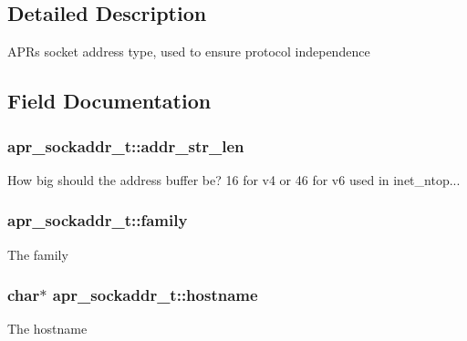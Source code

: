 \subsection{Detailed Description}
A\+P\+Rs socket address type, used to ensure protocol independence 

\subsection{Field Documentation}
\subsubsection[{\texorpdfstring{addr\+\_\+str\+\_\+len}{addr_str_len}}]{ apr\+\_\+sockaddr\+\_\+t\+::addr\+\_\+str\+\_\+len}\hypertarget{structapr__sockaddr__t_a8f7cda5562e904a1398ed5a4a6f0a9d9}{}\label{structapr__sockaddr__t_a8f7cda5562e904a1398ed5a4a6f0a9d9}
How big should the address buffer be? 16 for v4 or 46 for v6 used in inet\+\_\+ntop... 
\subsubsection[{\texorpdfstring{family}{family}}]{ apr\+\_\+sockaddr\+\_\+t\+::family}\hypertarget{structapr__sockaddr__t_ac17f6e803928cfc29069a6e62dcb3a52}{}\label{structapr__sockaddr__t_ac17f6e803928cfc29069a6e62dcb3a52}
The family 
\subsubsection[{\texorpdfstring{hostname}{hostname}}]{\setlength{\rightskip}{0pt plus 5cm}char$\ast$ apr\+\_\+sockaddr\+\_\+t\+::hostname}\hypertarget{structapr__sockaddr__t_a8e675775b407f25674aaa938a40de9cd}{}\label{structapr__sockaddr__t_a8e675775b407f25674aaa938a40de9cd}
The hostname 
